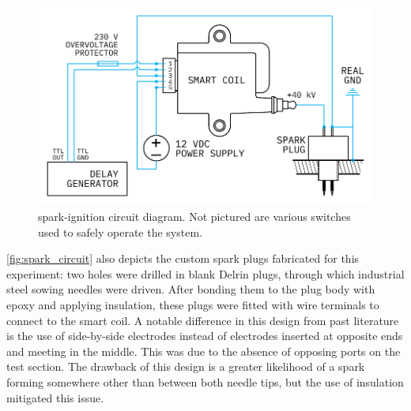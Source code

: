             \begin{figure}[h]
                \centering
                \includegraphics[]{assets/3 design/sparkIgniter}
                \caption[spark-ignition circuit diagram]{spark-ignition circuit diagram. Not pictured are various switches used to safely operate the system.}
                \label{fig:spark_circuit}
            \end{figure}

            \autoref{fig:spark_circuit} also depicts the custom spark plugs fabricated for this experiment: two holes were drilled in blank Delrin plugs, through which industrial steel sowing needles were driven. After bonding them to the plug body with epoxy and applying insulation, these plugs were fitted with wire terminals to connect to the smart coil. A notable difference in this design from past literature is the use of side-by-side electrodes instead of electrodes inserted at opposite ends and meeting in the middle. This was due to the absence of opposing ports on the test section. The drawback of this design is a greater likelihood of a spark forming somewhere other than between both needle tips, but the use of insulation mitigated this issue.

